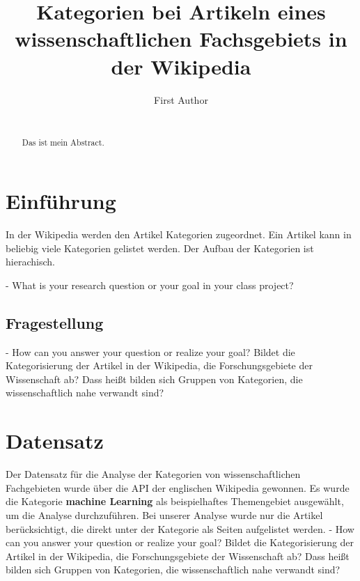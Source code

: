 \documentclass{acm_proc_article-sp}
\begin{document}
\title{Kategorien bei Artikeln eines wissenschaftlichen Fachsgebiets in der Wikipedia}

\author{
\alignauthor
	First Author\\
	\\
}

\maketitle
\begin{abstract}
	Das ist mein Abstract.
\end{abstract}

\section{Einführung}
In der Wikipedia werden den Artikel Kategorien zugeordnet. Ein Artikel kann in beliebig viele Kategorien gelistet werden. Der Aufbau der Kategorien ist hierachisch. 

- What is your research question or your goal in your class project?
\subsection{Fragestellung}
- How can you answer your question or realize your goal?
Bildet die Kategorisierung der Artikel in der Wikipedia, die Forschungsgebiete der Wissenschaft ab? Dass heißt bilden sich Gruppen von Kategorien, die wissenschaftlich nahe verwandt sind?

\section{Datensatz}
Der Datensatz für die Analyse der Kategorien von wissenschaftlichen Fachgebieten wurde über die API der englischen Wikipedia gewonnen. Es wurde die Kategorie \textbf{machine Learning} als beispielhaftes Themengebiet ausgewählt, um die Analyse durchzuführen. Bei unserer Analyse wurde nur die Artikel berücksichtigt, die direkt unter der Kategorie als Seiten aufgelistet werden.
- How can you answer your question or realize your goal?
Bildet die Kategorisierung der Artikel in der Wikipedia, die Forschungsgebiete der Wissenschaft ab? Dass heißt bilden sich Gruppen von Kategorien, die wissenschaftlich nahe verwandt sind?
\end{document}
